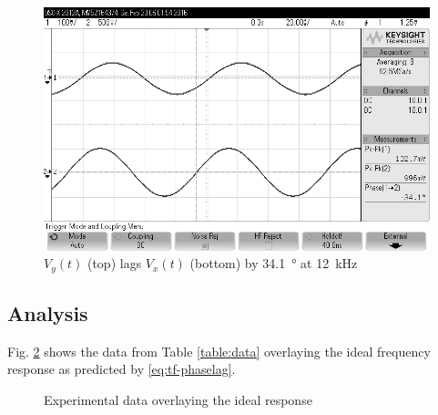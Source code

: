 \begin{figure}[tbph]
	\centering
	\includegraphics[width=0.65\linewidth]{graphics/12khz_phase_lag}
	\caption{$V_y(t)$ (top) lags $V_x(t)$ (bottom) by \SI{34.1}{\degree} at \SI{12}{\kilo\hertz}}
	\label{fig:scope}
\end{figure}

\subsection{Analysis}

Fig. \ref{fig:freq-response} shows the data from Table \ref{table:data} overlaying the ideal frequency response as predicted by \eqref{eq:tf-phaselag}.

\begin{figure}[htpb]
	\centering
	\label{fig:freq-response}
	\caption{Experimental data overlaying the ideal response}
\end{figure}
